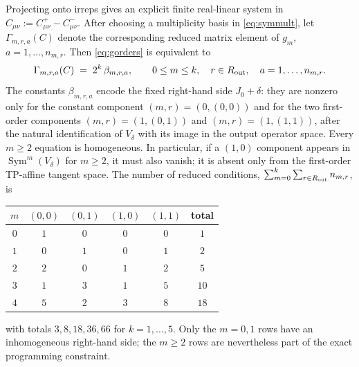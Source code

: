 \documentclass[11pt]{article}
\begin{document}
Projecting onto irreps gives an explicit finite real-linear system in
$C_{\mu\nu}:=C^{+}_{\mu\nu}-C^{-}_{\mu\nu}$. After choosing a multiplicity basis in
\eqref{eq:symmult}, let $\Gamma_{m,r,a}(C)$ denote the corresponding reduced matrix
element of $g_m$, $a=1,\dots,n_{m,r}$. Then \eqref{eq:gorders} is equivalent to
\begin{equation}\label{eq:C3scalar}
\Gamma_{m,r,a}(C)\;=\;2^k\,\beta_{m,r,a},
\qquad 0\le m\le k,\quad r\in R_{\rm out},\quad a=1,\dots,n_{m,r}.
\end{equation}
The constants $\beta_{m,r,a}$ encode the fixed right-hand side
$J_0+\delta$: they are nonzero only for the constant component
$(m,r)=(0,(0,0))$ and for the two first-order components
$(m,r)=(1,(0,1))$ and $(m,r)=(1,(1,1))$, after the natural identification of
$V_\delta$ with its image in the output operator space. Every $m\ge2$ equation is
homogeneous. In particular, if a $(1,0)$ component appears in
$\operatorname{Sym}^m(V_\delta)$ for $m\ge2$, it must also vanish; it is absent only from
the first-order TP-affine tangent space. The number of reduced conditions,
$\sum_{m=0}^k\sum_{r\in R_{\rm out}} n_{m,r}$, is
\begin{center}\small
\begin{tabular}{c|cccc|c}
$m$ & $(0,0)$ & $(0,1)$ & $(1,0)$ & $(1,1)$ & total\\\hline
$0$ & $1$ & $0$ & $0$ & $0$ & $1$\\
$1$ & $0$ & $1$ & $0$ & $1$ & $2$\\
$2$ & $2$ & $0$ & $1$ & $2$ & $5$\\
$3$ & $1$ & $3$ & $1$ & $5$ & $10$\\
$4$ & $5$ & $2$ & $3$ & $8$ & $18$\\
\end{tabular}
\end{center}
with totals $3,8,18,36,66$ for $k=1,\dots,5$. Only the $m=0,1$ rows have an
inhomogeneous right-hand side; the $m\ge2$ rows are nevertheless part of the exact
programming constraint.
\end{document}
